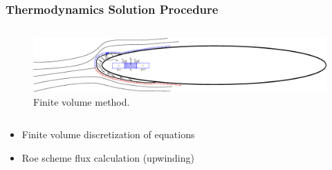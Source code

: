 \documentclass[9pt]{beamer}
\begin{document}
\begin{frame}
\frametitle{Thermodynamics Solution Procedure}
\label{sec-4-5}

\begin{columns}[c]
\hspace*{-0.5cm}
\centering
\begin{figure}[ht]
  \centering
  \includegraphics[trim=70mm 20mm 270mm 20mm,clip,width=1\textwidth]{FiniteVolume}
  \caption{Finite volume method.}
\end{figure}
\end{columns}
\begin{itemize}
\item Finite volume discretization of equations
\item Roe scheme flux calculation (upwinding)
\end{itemize}
\end{frame}
\end{document}
